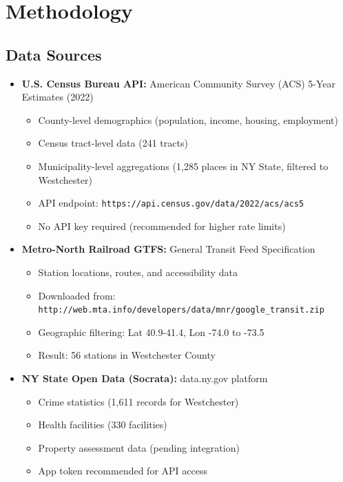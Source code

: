 \documentclass[11pt,letterpaper]{article}
\begin{document}
\section{Methodology}

\subsection{Data Sources}

\begin{itemize}
    \item \textbf{U.S. Census Bureau API:} American Community Survey (ACS) 5-Year Estimates (2022)
    \begin{itemize}
        \item County-level demographics (population, income, housing, employment)
        \item Census tract-level data (241 tracts)
        \item Municipality-level aggregations (1,285 places in NY State, filtered to Westchester)
        \item API endpoint: \texttt{https://api.census.gov/data/2022/acs/acs5}
        \item No API key required (recommended for higher rate limits)
    \end{itemize}
    
    \item \textbf{Metro-North Railroad GTFS:} General Transit Feed Specification
    \begin{itemize}
        \item Station locations, routes, and accessibility data
        \item Downloaded from: \texttt{http://web.mta.info/developers/data/mnr/google\_transit.zip}
        \item Geographic filtering: Lat 40.9-41.4, Lon -74.0 to -73.5
        \item Result: 56 stations in Westchester County
    \end{itemize}
    
    \item \textbf{NY State Open Data (Socrata):} data.ny.gov platform
    \begin{itemize}
        \item Crime statistics (1,611 records for Westchester)
        \item Health facilities (330 facilities)
        \item Property assessment data (pending integration)
        \item App token recommended for API access
    \end{itemize}
\end{itemize}
\end{document}
